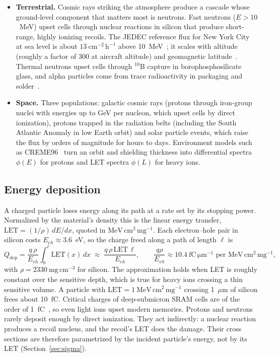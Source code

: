 \documentclass[11pt,a4paper]{article}
\newcommand{\LET}{\mathrm{LET}}
\begin{document}
\begin{itemize}
  \item \textbf{Terrestrial.} Cosmic rays striking the atmosphere produce a cascade whose ground-level component that matters most is neutrons. Fast neutrons ($E > 10$~MeV) upset cells through nuclear reactions in silicon that produce short-range, highly ionizing recoils. The JEDEC reference flux for New York City at sea level is about $13~\mathrm{cm^{-2}\,h^{-1}}$ above 10~MeV~\cite{jesd89a,gordon2004}; it scales with altitude (roughly a factor of 300 at aircraft altitude) and geomagnetic latitude~\cite{normand1996}. Thermal neutrons upset cells through $^{10}$B capture in borophosphosilicate glass, and alpha particles come from trace radioactivity in packaging and solder~\cite{may1979,baumann2005}.
  \item \textbf{Space.} Three populations: galactic cosmic rays (protons through iron-group nuclei with energies up to GeV per nucleon, which upset cells by direct ionization), protons trapped in the radiation belts (including the South Atlantic Anomaly in low Earth orbit) and solar particle events, which raise the flux by orders of magnitude for hours to days. Environment models such as CREME96~\cite{tylka1997} turn an orbit and shielding thickness into differential spectra $\phi(E)$ for protons and LET spectra $\phi(L)$ for heavy ions.
\end{itemize}

\subsection{Energy deposition}

A charged particle loses energy along its path at a rate set by its stopping power. Normalized by the material's density this is the linear energy transfer, $\LET = (1/\rho)\, dE/dx$, quoted in $\mathrm{MeV\,cm^2\,mg^{-1}}$. Each electron--hole pair in silicon costs $E_{eh} \approx 3.6$~eV, so the charge freed along a path of length $\ell$ is
\begin{equation}
Q_{\mathrm{dep}} = \frac{q\,\rho}{E_{eh}} \int_0^{\ell} \LET(x)\,dx \;\approx\; \frac{q\,\rho\,\LET\,\ell}{E_{eh}},
\qquad
\frac{q\rho}{E_{eh}} \approx 10.4~\mathrm{fC\,\mu m^{-1}} \text{ per } \mathrm{MeV\,cm^2\,mg^{-1}},
\label{eq:qdep}
\end{equation}
with $\rho = 2330~\mathrm{mg\,cm^{-3}}$ for silicon. The approximation holds when LET is roughly constant over the sensitive depth, which is true for heavy ions crossing a thin sensitive volume. A particle with $\LET = 1~\mathrm{MeV\,cm^2\,mg^{-1}}$ crossing 1~$\mu$m of silicon frees about 10~fC. Critical charges of deep-submicron SRAM cells are of the order of 1~fC~\cite{baumann2005}, so even light ions upset modern memories. Protons and neutrons rarely deposit enough by direct ionization. They act indirectly: a nuclear reaction produces a recoil nucleus, and the recoil's LET does the damage. Their cross sections are therefore parametrized by the incident particle's energy, not by its LET (Section~\ref{sec:sigma}).
\end{document}
